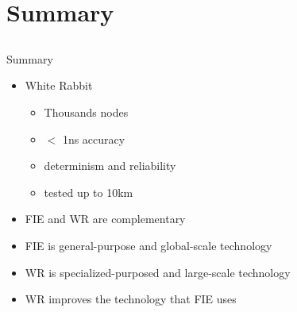 \documentclass[compress,red]{beamer}
\begin{document}
\section{Summary}
\subsection{}
\begin{frame}{Summary}


    \begin{itemize}
      \item White Rabbit
      \begin{itemize}
	\item Thousands nodes
	\item $<$ 1ns accuracy
	\item determinism and reliability
	\item tested up to 10km
      \end{itemize}
      \item FIE and WR are complementary
      \item FIE is general-purpose and global-scale technology
      \item WR is specialized-purposed and large-scale technology
      \item WR improves the technology that FIE uses

    \end{itemize}    

 
\end{frame}
% 
\end{document}
